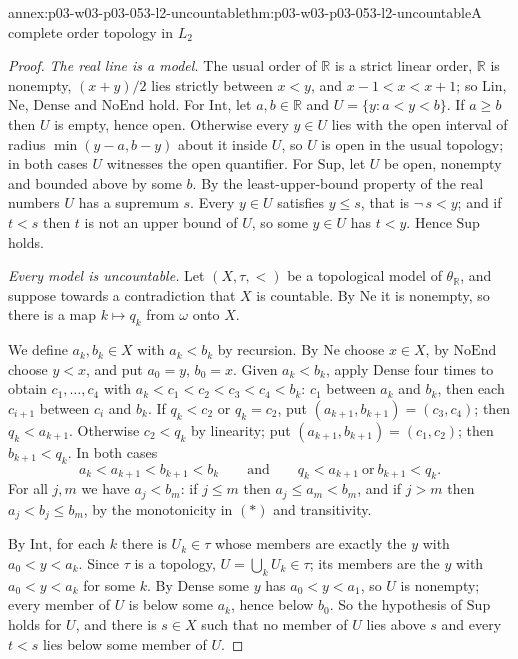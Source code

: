 \begin{annexitem}{annex:p03-w03-p03-053-l2-uncountable}{thm:p03-w03-p03-053-l2-uncountable}{A complete order topology in \(L_2\)}
\begin{proof}
\emph{The real line is a model.} The usual order of \(\mathbb R\) is a
strict linear order, \(\mathbb R\) is nonempty, \((x+y)/2\) lies strictly
between \(x<y\), and \(x-1<x<x+1\); so \(\mathrm{Lin}\), \(\mathrm{Ne}\),
\(\mathrm{Dense}\) and \(\mathrm{NoEnd}\) hold. For \(\mathrm{Int}\), let
\(a,b\in\mathbb R\) and \(U=\{y:a<y<b\}\). If \(a\ge b\) then \(U\) is
empty, hence open. Otherwise every \(y\in U\) lies with the open interval
of radius \(\min(y-a,b-y)\) about it inside \(U\), so \(U\) is open in the
usual topology; in both cases \(U\) witnesses the open quantifier. For
\(\mathrm{Sup}\), let \(U\) be open, nonempty and bounded above by some
\(b\). By the least-upper-bound property of the real numbers \(U\) has a
supremum \(s\). Every \(y\in U\) satisfies \(y\le s\), that is
\(\neg\,s<y\); and if \(t<s\) then \(t\) is not an upper bound of \(U\),
so some \(y\in U\) has \(t<y\). Hence \(\mathrm{Sup}\) holds.

\emph{Every model is uncountable.} Let \((X,\tau,<)\) be a topological
model of \(\theta_{\mathbb R}\), and suppose towards a contradiction that
\(X\) is countable. By \(\mathrm{Ne}\) it is nonempty, so there is a map
\(k\mapsto q_k\) from \(\omega\) onto \(X\).

We define \(a_k,b_k\in X\) with \(a_k<b_k\) by recursion. By
\(\mathrm{Ne}\) choose \(x\in X\), by \(\mathrm{NoEnd}\) choose \(y<x\),
and put \(a_0=y\), \(b_0=x\). Given \(a_k<b_k\), apply \(\mathrm{Dense}\)
four times to obtain \(c_1,\ldots,c_4\) with
\(a_k<c_1<c_2<c_3<c_4<b_k\): \(c_1\) between \(a_k\) and \(b_k\), then
each \(c_{i+1}\) between \(c_i\) and \(b_k\). If \(q_k<c_2\) or
\(q_k=c_2\), put \((a_{k+1},b_{k+1})=(c_3,c_4)\); then
\(q_k<a_{k+1}\). Otherwise \(c_2<q_k\) by linearity; put
\((a_{k+1},b_{k+1})=(c_1,c_2)\); then \(b_{k+1}<q_k\). In both cases
\[
 a_k<a_{k+1}<b_{k+1}<b_k
 \qquad\text{and}\qquad
 q_k<a_{k+1}\ \text{or}\ b_{k+1}<q_k. \tag{\(\ast\)}
\]
For all \(j,m\) we have \(a_j<b_m\): if \(j\le m\) then
\(a_j\le a_m<b_m\), and if \(j>m\) then \(a_j<b_j\le b_m\), by the
monotonicity in \((\ast)\) and transitivity.

By \(\mathrm{Int}\), for each \(k\) there is \(U_k\in\tau\) whose members
are exactly the \(y\) with \(a_0<y<a_k\). Since \(\tau\) is a topology,
\(U=\bigcup_kU_k\in\tau\); its members are the \(y\) with \(a_0<y<a_k\)
for some \(k\). By \(\mathrm{Dense}\) some \(y\) has \(a_0<y<a_1\), so
\(U\) is nonempty; every member of \(U\) is below some \(a_k\), hence
below \(b_0\). So the hypothesis of \(\mathrm{Sup}\) holds for \(U\), and
there is \(s\in X\) such that no member of \(U\) lies above \(s\) and
every \(t<s\) lies below some member of \(U\).


\end{proof}
\end{annexitem}
